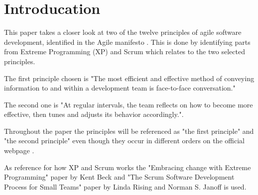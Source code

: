 \section{Introducation}
   This paper takes a closer look at two of the twelve principles of agile
   software development, identified in the Agile manifesto \cite{web:agilemanifesto}.
   This is done by identifying parts from Extreme Programming (XP)
   and Scrum which relates to the two selected principles.

   The first principle chosen is "The most efficient and effective method of
   conveying information to and within a development team is face-to-face
   conversation."

   The second one is "At regular intervals, the team reflects on how to become
   more effective, then tunes and adjusts its behavior accordingly.".

   Throughout the paper the principles will be referenced as "the first
   principle" and "the second principle" even though they occur in different
   orders on the official webpage \cite{web:agileprinciples}.

   As reference for how XP and Scrum works the "Embracing change with Extreme
   Programming" paper by Kent Beck \cite{beck99} and "The Scrum Software
   Development Process for Small Teams" paper by Linda Rising and Norman S.
   Janoff \cite{rising00} is used.
